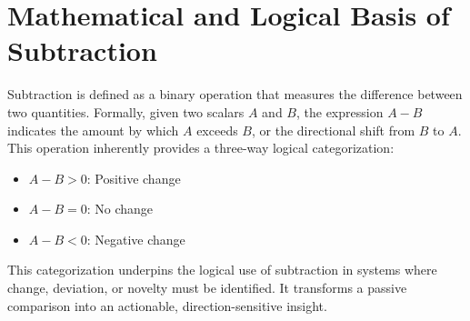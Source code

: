 \section{Mathematical and Logical Basis of Subtraction}
Subtraction is defined as a binary operation that measures the difference between two quantities. Formally, given two scalars $A$ and $B$, the expression $A - B$ indicates the amount by which $A$ exceeds $B$, or the directional shift from $B$ to $A$. This operation inherently provides a three-way logical categorization:
\begin{itemize}
	\item $A - B > 0$: Positive change
	\item $A - B = 0$: No change
	\item $A - B < 0$: Negative change
\end{itemize}

This categorization underpins the logical use of subtraction in systems where change, deviation, or novelty must be identified. It transforms a passive comparison into an actionable, direction-sensitive insight.